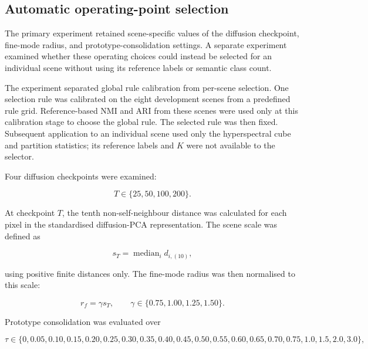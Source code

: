 \documentclass[10pt,a4paper,fleqn]{article}
\begin{document}
\subsection{Automatic operating-point selection}
\label{subsec:auto_selector}

The primary experiment retained scene-specific values of the diffusion
checkpoint, fine-mode radius, and prototype-consolidation settings. A separate
experiment examined whether these operating choices could instead be selected
for an individual scene without using its reference labels or semantic class
count.

The experiment separated global rule calibration from per-scene selection.
One selection rule was calibrated on the eight development scenes from a
predefined rule grid. Reference-based NMI and ARI from these scenes were used
only at this calibration stage to choose the global rule. The selected rule
was then fixed. Subsequent application to an individual scene used only the
hyperspectral cube and partition statistics; its reference labels and \(K\)
were not available to the selector.

Four diffusion checkpoints were examined:

\begin{equation}
T\in\{25,50,100,200\}.
\label{eq:auto_T_grid}
\end{equation}

At checkpoint \(T\), the tenth non-self-neighbour distance was calculated for
each pixel in the standardised diffusion-PCA representation. The scene scale
was defined as

\begin{equation}
s_T
=
\operatorname{median}_{i}
d_{i,(10)},
\label{eq:auto_scene_scale}
\end{equation}

using positive finite distances only. The fine-mode radius was then
normalised to this scale:

\begin{equation}
r_f
=
\gamma s_T,
\qquad
\gamma
\in
\{0.75,1.00,1.25,1.50\}.
\label{eq:auto_radius}
\end{equation}

Prototype consolidation was evaluated over

\begin{equation}
\tau\in
\{
0,0.05,0.10,0.15,0.20,0.25,0.30,0.35,0.40,0.45,
0.50,0.55,0.60,0.65,0.70,0.75,1.0,1.5,2.0,3.0
\},
\label{eq:auto_tau_grid}
\end{equation}
\end{document}
